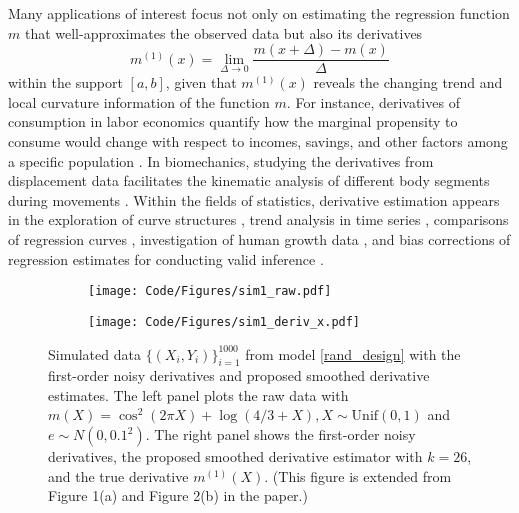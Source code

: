 \documentclass{uwstat572}
\theoremstyle{definition}
\theoremstyle{theorem}
\begin{document}
Many applications of interest focus not only on estimating the regression function $m$ that well-approximates the observed data but also its derivatives
\begin{equation}
\label{deriv_def}
m^{(1)}(x) =\lim\limits_{\Delta\to 0} \frac{m(x+\Delta) - m(x)}{\Delta}
\end{equation}
within the support $[a,b]$, given that $m^{(1)}(x)$ reveals the changing trend and local curvature information of the function $m$. For instance, derivatives of consumption in labor economics quantify how the marginal propensity to consume \citep{haavelmo1947methods} would change with respect to incomes, savings, and other factors among a specific population \citep{dang2021smoothed,dang2022machine}. In biomechanics, studying the derivatives from displacement data facilitates the kinematic analysis of different body segments during movements \citep{woltring1985optimal}. Within the fields of statistics, derivative estimation appears in the exploration of curve structures \citep{chaudhuri1999sizer,gijbels2005data}, trend analysis in time series \citep{rondonotti2007sizer}, comparisons of regression curves \citep{park2008sizer}, investigation of human growth data \citep{Mller1988NonparametricRA,ramsay2002applied}, and bias corrections of regression estimates for conducting valid inference \citep{eubank1993confidence,xia1998bias,calonico2018effect,cheng2019nonparametric}.

\begin{figure}
	\captionsetup[subfigure]{justification=centering}
	\begin{subfigure}[t]{0.49\linewidth}
		\centering
		\texttt{[image: Code/Figures/sim1\_raw.pdf]}
	\end{subfigure}
	\hfil
	\begin{subfigure}[t]{0.49\linewidth}
		\centering
		\texttt{[image: Code/Figures/sim1\_deriv\_x.pdf]}
	\end{subfigure}
	\caption{Simulated data $\{(X_i,Y_i)\}_{i=1}^{1000}$ from model \eqref{rand_design} with the first-order noisy derivatives and proposed smoothed derivative estimates. The left panel plots the raw data with $m(X) = \cos^2(2\pi X) + \log(4/3 +X), X\sim \mathrm{Unif}(0,1)$ and $e\sim N(0,0.1^2)$. The right panel shows the first-order noisy derivatives, the proposed smoothed derivative estimator with $k=26$, and the true derivative $m^{(1)}(X)$. (This figure is extended from Figure 1(a) and Figure 2(b) in the paper.)}
	\label{fig:sim1}
\end{figure}
\end{document}

